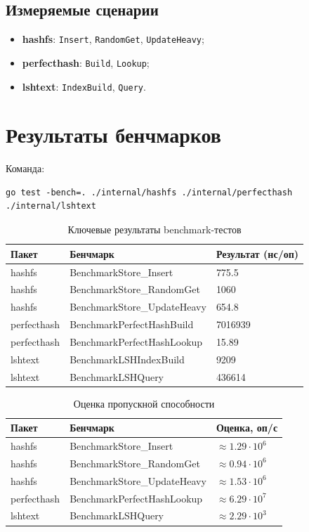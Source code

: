 \documentclass{itmo}
\begin{document}
\subsection*{Измеряемые сценарии}
\begin{itemize}
	\item \textbf{hashfs}: \texttt{Insert}, \texttt{RandomGet}, \texttt{UpdateHeavy};
	\item \textbf{perfecthash}: \texttt{Build}, \texttt{Lookup};
	\item \textbf{lshtext}: \texttt{IndexBuild}, \texttt{Query}.
\end{itemize}

\section{Результаты бенчмарков}

Команда:
\begin{verbatim}
go test -bench=. ./internal/hashfs ./internal/perfecthash ./internal/lshtext
\end{verbatim}

\begin{table}[H]
	\centering
	\caption{Ключевые результаты benchmark-тестов}
	\begin{tabular}{|l|l|l|}
		\hline
		Пакет & Бенчмарк & Результат (нс/оп) \\
		\hline
		hashfs & BenchmarkStore\_Insert & 775.5 \\
		hashfs & BenchmarkStore\_RandomGet & 1060 \\
		hashfs & BenchmarkStore\_UpdateHeavy & 654.8 \\
		perfecthash & BenchmarkPerfectHashBuild & 7016939 \\
		perfecthash & BenchmarkPerfectHashLookup & 15.89 \\
		lshtext & BenchmarkLSHIndexBuild & 9209 \\
		lshtext & BenchmarkLSHQuery & 436614 \\
		\hline
	\end{tabular}
\end{table}

\begin{table}[H]
	\centering
	\caption{Оценка пропускной способности}
	\begin{tabular}{|l|l|l|}
		\hline
		Пакет & Бенчмарк & Оценка, оп/с \\
		\hline
		hashfs & BenchmarkStore\_Insert & \(\approx 1.29 \cdot 10^6\) \\
		hashfs & BenchmarkStore\_RandomGet & \(\approx 0.94 \cdot 10^6\) \\
		hashfs & BenchmarkStore\_UpdateHeavy & \(\approx 1.53 \cdot 10^6\) \\
		perfecthash & BenchmarkPerfectHashLookup & \(\approx 6.29 \cdot 10^7\) \\
		lshtext & BenchmarkLSHQuery & \(\approx 2.29 \cdot 10^3\) \\
		\hline
	\end{tabular}
\end{table}
\end{document}
